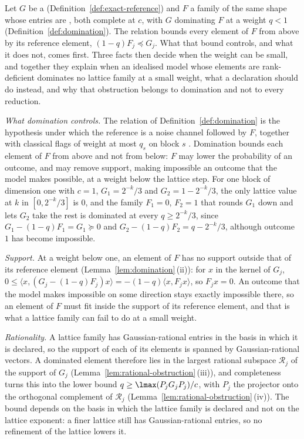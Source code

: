 \begin{remark}\label{rem:noise-floor}
Let $G$ be a  (Definition~\ref{def:exact-reference}) and $F$
a family of the same shape whose entries are , both complete at $c$, with $G$ dominating $F$ at a weight $q<1$
(Definition~\ref{def:domination}). The relation bounds every element of $F$
from above by its reference element, $(1-q)F_j\preceq G_j$. What that bound
controls, and what it does not, comes first. Three facts then decide when the
weight can be small, and together they explain when an idealised model whose
elements are rank-deficient dominates no lattice family at a small weight,
what a declaration should do instead, and why that obstruction belongs to
domination and not to every reduction.

\emph{What domination controls.} The relation of
Definition~\ref{def:domination} is the hypothesis under which the reference
is a noise channel followed by $F$, together with classical flags of
weight at most $q_s$ on block $s$ \cite[Thm.~3, Eq.~(20)]{nahar2025imperfect}.
Domination bounds each element of $F$ from above and not from below: $F$
may lower the probability of an outcome, and may remove support, making
impossible an outcome that the model makes possible, at a weight below the
lattice step. For one block of dimension one with $c=1$,
$G_1=2^{-k}/3$ and $G_2=1-2^{-k}/3$, the only lattice value at $k$ in
$[0,2^{-k}/3]$ is $0$, and the family $F_1=0$, $F_2=1$ that rounds $G_1$
down and lets $G_2$ take the rest is dominated at every $q\ge2^{-k}/3$,
since $G_1-(1-q)F_1=G_1\succeq0$ and $G_2-(1-q)F_2=q-2^{-k}/3$, although
outcome~$1$ has become impossible.

\emph{Support.} At a weight below one, an element of $F$ has no support
outside that of its reference element (Lemma~\ref{lem:domination}\,(ii)): for
$x$ in the kernel of $G_j$,
$0\le\langle x,(G_j-(1-q)F_j)x\rangle=-(1-q)\langle x,F_jx\rangle$, so
$F_jx=0$. An outcome that the model makes impossible on some direction stays
exactly impossible there, so an element of $F$ must fit inside the support of
its reference element, and that is what a lattice family can fail to do at a
small weight.

\emph{Rationality.} A lattice family has Gaussian-rational entries in the
basis in which it is declared, so the support of each of its elements is
spanned by Gaussian-rational vectors. A dominated element therefore lies in
the largest rational subspace $\mathcal{R}_j$ of the support of $G_j$
(Lemma~\ref{lem:rational-obstruction}\,(iii)), and completeness turns this
into the lower bound $q\ge\lmax(P_jG_jP_j)/c$, with $P_j$ the projector onto
the orthogonal complement of $\mathcal{R}_j$
(Lemma~\ref{lem:rational-obstruction}\,(iv)). The bound depends on the basis
in which the lattice family is declared and not on the lattice exponent: a
finer lattice still has Gaussian-rational entries, so no refinement of the
lattice lowers it.


\end{remark}
